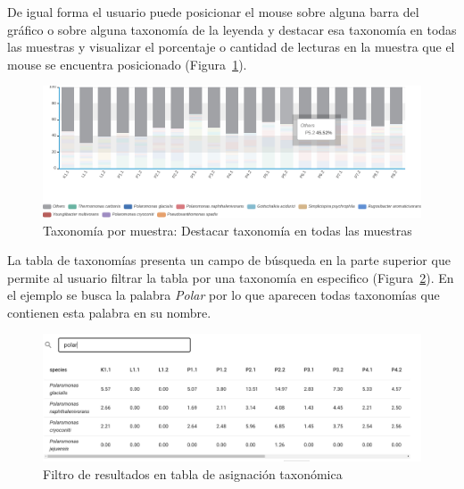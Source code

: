 De igual forma el usuario puede posicionar el mouse sobre alguna barra del gráfico o sobre alguna taxonomía de la leyenda y destacar esa taxonomía en todas las muestras y visualizar el porcentaje o cantidad de lecturas en la muestra que el mouse se encuentra posicionado (Figura~\ref{fig:app-results-taxonomicAssig-others}).
\begin{figure}[H]
    \includegraphics[width=1\linewidth]{images/app/results/taxonomy_others.pdf}

    \caption{Taxonomía por muestra: Destacar taxonomía en todas las muestras}
    \label{fig:app-results-taxonomicAssig-others}
\end{figure}


La tabla de taxonomías presenta un campo de búsqueda en la parte superior que permite al usuario filtrar la tabla por una taxonomía en especifico (Figura~\ref{fig:app-results-taxonomy-search}).
En el ejemplo se busca la palabra \textit{Polar} por lo que aparecen todas taxonomías que contienen esta palabra en su nombre.
\begin{figure}[H]
    \includegraphics[width=0.9\linewidth]{images/app/results/taxonomy_search.png}

    \caption{Filtro de resultados en tabla de asignación taxonómica}
    \label{fig:app-results-taxonomy-search}
\end{figure}

